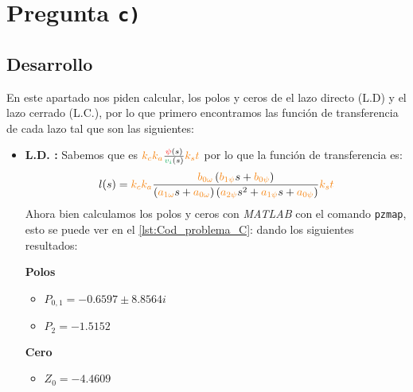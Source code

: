 \section{Pregunta \texttt{c)}}\label{pregunta-c}
\subsection{Desarrollo}

En este apartado nos piden calcular, los polos y ceros de el lazo directo (L.D) 
y el lazo cerrado (L.C.), por lo que primero encontramos las función de 
transferencia de cada lazo tal que son las siguientes:

\begin{itemize}
    \item \textbf{L.D. :} Sabemos que es \( \nara{k_c k_a} \frac{\rojo{\psi}(s)}{\verd{v_i}(s)}\nara{k_st} \) por lo que la función de transferencia es:
    \begin{equation}
        l(s)= \nara{k_ck_a} \frac{\nara{\nara{b_{0\omega}}}\left(\nara{b_{1\psi}}s + \nara{b_{0\psi}}\right)}
        {\left(\nara{a_{1\omega}}s + \nara{a_{0\omega}}\right)\left(\nara{a_{2\psi}}s^{2} + \nara{a_{1\psi}}s + \nara{a_{0\psi}}\right)} \nara{k_st}
    \end{equation}
    Ahora bien calculamos los polos y ceros con \textit{MATLAB} con el comando \verb|pzmap|, esto se puede ver en el \autoref{lst:Cod_problema_C}: dando los siguientes resultados:

\begin{multicols}{2}
    \textbf{Polos}
    \begin{itemize}
        \item \(P_{0,1} = -0.6597 \pm 8.8564i\) 
        \item \(P_2 = -1.5152 \)
    \end{itemize}
    \columnbreak
    \textbf{Cero}
    \begin{itemize}
        \item \(Z_0 = -4.4609\)
    \end{itemize}
  \end{multicols}


\end{itemize}
